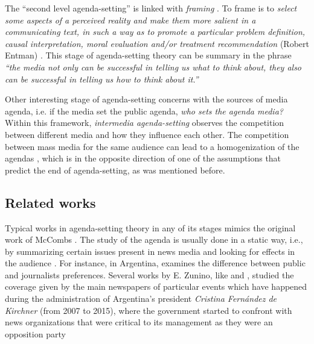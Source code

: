 \par The ``second level agenda-setting'' is linked with \textit{framing} \cite{guggenheim2015dynamics} \cite{tsur2015frame}. 
To frame is to \textit{select some aspects of a perceived reality and make them more salient in a communicating text, in such a way as to promote a particular problem definition, causal interpretation, moral evaluation and/or treatment recommendation} (Robert Entman) \cite{mccombs2005look}.
This stage of agenda-setting theory can be summary in the phrase \textit{``the media not only can be successful in telling us what to think about, they also can be successful in telling us how to think about it.''} 

\par Other interesting stage of agenda-setting concerns with the sources of media agenda, i.e. if the media set the public agenda, \textit{who sets the agenda media?} 
Within this framework, \textit{intermedia agenda-setting} observes the competition between different media and how they influence each other.
The competition between mass media for the same audience can lead to a homogenization of the agendas \cite{vargo2017networks}, which is in the opposite direction of one of the assumptions that predict the end of agenda-setting, as was mentioned before.


\subsection{Related works}

\par Typical works in agenda-setting theory in any of its stages mimics the original work of McCombs \cite{mccombs1972agenda}.
The study of the agenda is usually done in a static way, i.e., by summarizing certain issues present in news media and looking for effects in the audience \cite{brians1996campaign}\cite{gerber2009does}\cite{coleman2007young}.
For instance, in Argentina, \cite{mitchelstein2016brecha} examines the difference between public and journalists preferences. 
Several works by E. Zunino, like \cite{zunino2010cobertura} and \cite{koziner2013cobertura}, studied the coverage given by the main newspapers of particular events which have happened during the administration of Argentina’s president \emph{Cristina Fernández de Kirchner} (from 2007 to 2015), where the government started to confront with news organizations that were critical to its management as they were an opposition party \cite{mitchelstein2017information}

